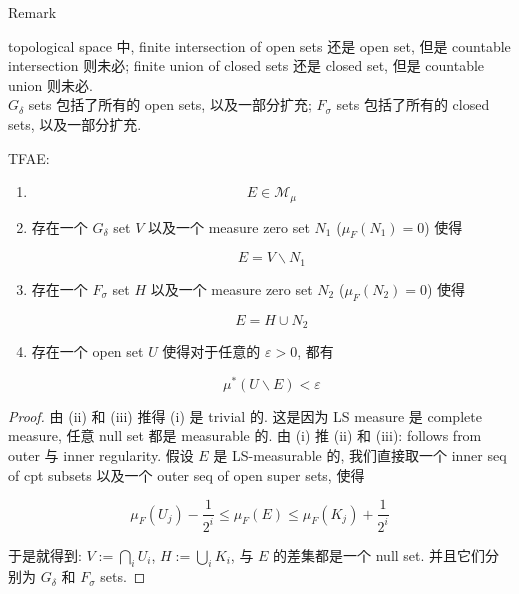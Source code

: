 \begin{qlremark}{Remark}

topological space 中, finite intersection of open sets 还是 open set, 但是 countable intersection 则未必; finite union of closed sets 还是 closed set, 但是 countable union 则未必.\\
\(G_{\delta}\) sets 包括了所有的 open sets, 以及一部分扩充; \(F_{\sigma}\) sets 包括了所有的 closed sets, 以及一部分扩充.

\end{qlremark}

\begin{theorem}{}\label{thm-03-distribution-function-lebesgue-stieltjes-measures-lebesgue-stieltjes-measurable}

TFAE:

\begin{enumerate}
\item
  \[E \in \mathcal{M}_{\mu}\]
\item
  存在一个 \(G_{\delta}\) set \(V\) 以及一个 measure zero set \(N_{1}\) (\(\mu_{F}(N_{1}) = 0\)) 使得

  \[E = V\backslash N_{1}\]
\item
  存在一个 \(F_{\sigma}\) set \(H\) 以及一个 measure zero set \(N_{2}\) (\(\mu_{F}(N_{2}) = 0\)) 使得

  \[E = H \cup N_{2}\]
\item
  存在一个 open set \(U\) 使得对于任意的 \(\varepsilon > 0\), 都有

  \[\mu^{\ast}(U\backslash E) < \varepsilon\]
\end{enumerate}

\end{theorem}

\begin{proof}

由 (ii) 和 (iii) 推得 (i) 是 trivial 的. 这是因为 LS measure 是 complete measure, 任意 null set 都是 measurable 的. 由 (i) 推 (ii) 和 (iii): follows from outer 与 inner regularity. 假设 \(E\) 是 LS-measurable 的, 我们直接取一个 inner seq of cpt subsets 以及一个 outer seq of open super sets, 使得

\[\mu_{F}(U_{j}) - \frac{1}{2^{i}} \leq \mu_{F}(E) \leq \mu_{F}(K_{j}) + \frac{1}{2^{i}}\]

于是就得到: \(V := \bigcap_{i}U_{i}\), \(H := \bigcup_{i}K_{i}\), 与 \(E\) 的差集都是一个 null set. 并且它们分别为 \(G_{\delta}\) 和 \(F_{\sigma}\) sets.

\end{proof}

